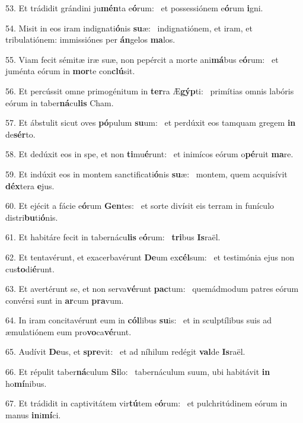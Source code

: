 53. Et trádidit grándini ju\textbf{mén}ta e\textbf{ó}rum: \ast\  et possessiónem e\textbf{ó}rum \textbf{i}gni.\

54. Misit in eos iram indignati\textbf{ó}nis \textbf{su}æ: \ast\  indignatiónem, et iram, et tribulatiónem: immissiónes per \textbf{án}gelos \textbf{ma}los.\

55. Viam fecit sémitæ iræ suæ, non pepércit a morte ani\textbf{má}bus e\textbf{ó}rum: \ast\  et juménta eórum in \textbf{mor}te con\textbf{clú}sit.\

56. Et percússit omne primogénitum in \textbf{ter}ra Æ\textbf{gýp}ti: \ast\  primítias omnis labóris eórum in taber\textbf{ná}cu\textbf{lis} Cham.\

57. Et ábstulit sicut oves \textbf{pó}pulum \textbf{su}um: \ast\  et perdúxit eos tamquam gregem \textbf{in} de\textbf{sér}to.\

58. Et dedúxit eos in spe, et non \textbf{ti}mu\textbf{é}runt: \ast\  et inimícos eórum o\textbf{pé}ruit \textbf{ma}re.\

59. Et indúxit eos in montem sanctificati\textbf{ó}nis \textbf{su}æ: \ast\  montem, quem acquisívit \textbf{déx}tera \textbf{e}jus.\

60. Et ejécit a fácie e\textbf{ó}rum \textbf{Gen}tes: \ast\  et sorte divísit eis terram in funículo distri\textbf{bu}ti\textbf{ó}nis.\

61. Et habitáre fecit in tabernácu\textbf{lis} e\textbf{ó}rum: \ast\  \textbf{tri}bus \textbf{Is}raël.\

62. Et tentavérunt, et exacerbavérunt \textbf{De}um ex\textbf{cél}sum: \ast\  et testimónia ejus non cus\textbf{to}di\textbf{é}runt.\

63. Et avertérunt se, et non serva\textbf{vé}runt \textbf{pac}tum: \ast\  quemádmodum patres eórum convérsi sunt in \textbf{ar}cum \textbf{pra}vum.\

64. In iram concitavérunt eum in \textbf{cól}libus \textbf{su}is: \ast\  et in sculptílibus suis ad æmulatiónem eum pro\textbf{vo}ca\textbf{vé}runt.\

65. Audívit \textbf{De}us, et \textbf{spre}vit: \ast\  et ad níhilum redégit \textbf{val}de \textbf{Is}raël.\

66. Et répulit taber\textbf{ná}culum \textbf{Si}lo: \ast\  tabernáculum suum, ubi habitávit \textbf{in} ho\textbf{mí}nibus.\

67. Et trádidit in captivitátem vir\textbf{tú}tem e\textbf{ó}rum: \ast\  et pulchritúdinem eórum in manus \textbf{in}i\textbf{mí}ci.\

